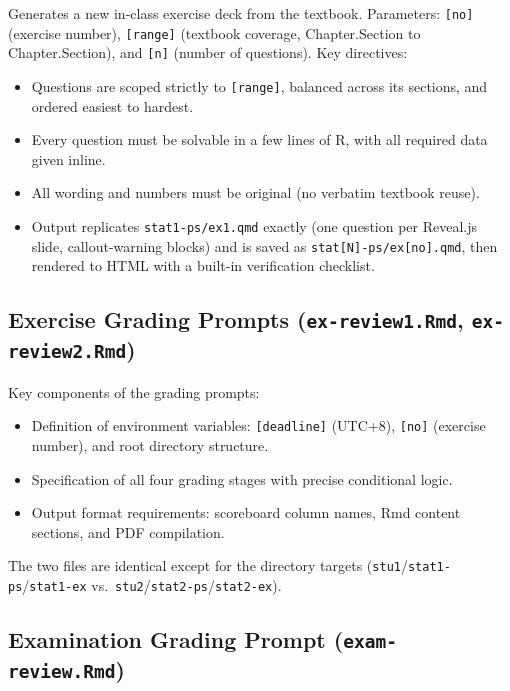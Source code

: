 \documentclass[
]{article}
\providecommand{\tightlist}{%
  \setlength{\itemsep}{0pt}\setlength{\parskip}{0pt}}
\begin{document}
Generates a new in-class exercise deck from the textbook. Parameters:
\texttt{{[}no{]}} (exercise number), \texttt{{[}range{]}} (textbook
coverage, Chapter.Section to Chapter.Section), and \texttt{{[}n{]}}
(number of questions). Key directives:

\begin{itemize}
\tightlist
\item
  Questions are scoped strictly to \texttt{{[}range{]}}, balanced across
  its sections, and ordered easiest to hardest.
\item
  Every question must be solvable in a few lines of R, with all required
  data given inline.
\item
  All wording and numbers must be original (no verbatim textbook reuse).
\item
  Output replicates \texttt{stat1-ps/ex1.qmd} exactly (one question per
  Reveal.js slide, callout-warning blocks) and is saved as
  \texttt{stat{[}N{]}-ps/ex{[}no{]}.qmd}, then rendered to HTML with a
  built-in verification checklist.
\end{itemize}

\subsection{\texorpdfstring{Exercise Grading Prompts
(\texttt{ex-review1.Rmd},
\texttt{ex-review2.Rmd})}{Exercise Grading Prompts (ex-review1.Rmd, ex-review2.Rmd)}}\label{exercise-grading-prompts-ex-review1.rmd-ex-review2.rmd}

Key components of the grading prompts:

\begin{itemize}
\tightlist
\item
  Definition of environment variables: \texttt{{[}deadline{]}} (UTC+8),
  \texttt{{[}no{]}} (exercise number), and root directory structure.
\item
  Specification of all four grading stages with precise conditional
  logic.
\item
  Output format requirements: scoreboard column names, Rmd content
  sections, and PDF compilation.
\end{itemize}

The two files are identical except for the directory targets
(\texttt{stu1}/\texttt{stat1-ps}/\texttt{stat1-ex}
vs.~\texttt{stu2}/\texttt{stat2-ps}/\texttt{stat2-ex}).

\subsection{\texorpdfstring{Examination Grading Prompt
(\texttt{exam-review.Rmd})}{Examination Grading Prompt (exam-review.Rmd)}}\label{examination-grading-prompt-exam-review.rmd}
\end{document}
